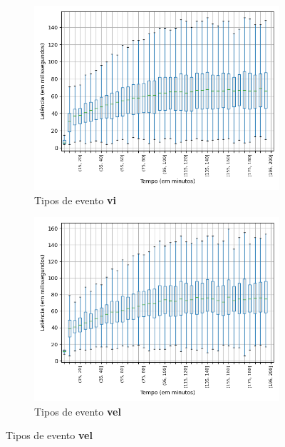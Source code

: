 \begin{figure}
\begin{subfigure}{.5\textwidth}
\centering
\includegraphics[width=\textwidth]{figuras/graphics/boxplot_9-dez-su_vi.png}
\caption{Tipos de evento \textbf{vi}}
\label{fig:BoxPlot_vi_SU_9-dez-su}
\end{subfigure}%
\centering
\begin{subfigure}{.5\textwidth}
\centering
\includegraphics[width=\textwidth]{figuras/graphics/boxplot_9-dez-su_vel.png}
\caption{Tipos de evento \textbf{vel}}
\label{fig:BoxPlot_vel_SU_9-dez-su}
\end{subfigure}%


\end{figure}
